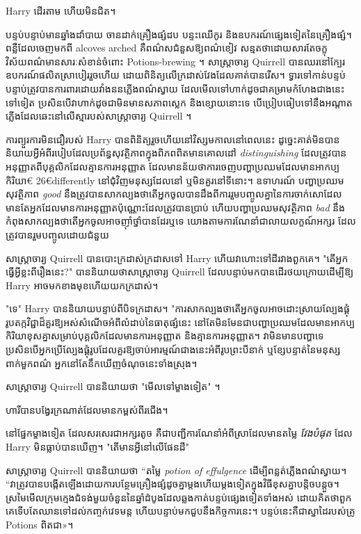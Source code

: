 Harry ដើរតាម ហើយមិនជិត។

\later

បន្ទប់បន្ទាប់​មាន​ឆ្នាំង​ដាំបាយ ចាន​ដាក់​គ្រឿង​ផ្សំ​ដប បន្ទះ​ឈើ​កូរ និង​ឧបករណ៍​ផ្សេង​ទៀត​នៃ​គ្រឿង​ផ្សំ។ ពន្លឺដែលចេញមកពី alcoves arched គឺពណ៌សជំនួសឱ្យពណ៌ខៀវ សន្មតថាដោយសារតែចក្ខុវិស័យពណ៌មានសារៈសំខាន់ចំពោះ Potions-brewing ។ សាស្ត្រាចារ្យ Quirrell បានឈរនៅក្បែរឧបករណ៍ផលិតស្រាបៀររួចហើយ ដោយពិនិត្យលើក្រដាស់វែងដែលគាត់បានរើស។ ទ្វារទៅកាន់បន្ទប់បន្ទាប់ត្រូវបានការពារដោយវាំងននភ្លើងពណ៌ស្វាយ ដែលមើលទៅហាក់ដូចជាគម្រាមកំហែងជាងនេះទៅទៀត ប្រសិនបើវាហាក់ដូចជាមិនមានសភាពស្លេក និងខ្សោយនោះទេ បើប្រៀបធៀបទៅនឹងអណ្តាតភ្លើងដែលឆេះនៅលើស្មារបស់សាស្រ្តាចារ្យ Quirrell ។

ការព្យួរការមិនជឿរបស់ Harry បានពិនិត្យរួចហើយនៅវិស្សមកាលនៅពេលនេះ ដូច្នេះគាត់មិនបាននិយាយអ្វីអំពីរបៀបដែលប្រព័ន្ធសុវត្ថិភាពក្នុងពិភពពិតមានគោលដៅ \emph{distinguishing} ដែលត្រូវបានអនុញ្ញាតពីបុគ្គលិកដែលគ្មានការអនុញ្ញាត ដែលមានន័យថាការចេញបញ្ហាប្រឈមដែលមានអាកប្បកិរិយា€ 26€{differently} នៅជុំវិញមនុស្សដែលនៅ ឬមិនគួរនៅទីនោះ។ ឧទាហរណ៍ បញ្ហាប្រឈមសុវត្ថិភាព \emph{good} នឹងត្រូវបានសាកល្បងថាតើអ្នកចូលបានដឹងពីការរួមបញ្ចូលគ្នានៃការចាក់សោដែលមានតែអ្នកដែលមានការអនុញ្ញាតប៉ុណ្ណោះដែលត្រូវបានប្រាប់ ហើយបញ្ហាប្រឈមសុវត្ថិភាព \emph{bad} នឹងកំពុងសាកល្បងថាតើអ្នកចូលអាចញ៉ាំថ្នាំបានដែរឬទេ យោងតាមការណែនាំជាលាយលក្ខណ៍អក្សរ ដែលត្រូវបានរួមបញ្ចូលដោយជំនួយ

សាស្ត្រាចារ្យ Quirrell បានបោះក្រដាស់ក្រដាសទៅ Harry ហើយវាហោះទៅដីរវាងពួកគេ។ "តើអ្នកធ្វើអ្វីខ្លះពីរឿងនេះ?" បាននិយាយថាសាស្រ្តាចារ្យ Quirrell ដែលបន្ទាប់មកបានដើរថយក្រោយដើម្បីឱ្យ Harry អាចមកខាងមុខហើយយកក្រដាស់។

"ទេ" Harry បាននិយាយបន្ទាប់ពីបិទក្រដាស។ "ការសាកល្បងថាតើអ្នកចូលអាចដោះស្រាយល្បែងផ្គុំរូបតក្កវិជ្ជាដ៏គួរឱ្យអស់សំណើចអំពីលំដាប់នៃធាតុផ្សំនេះ នៅតែមិនមែនជាបញ្ហាប្រឈមដែលមានអាកប្បកិរិយាខុសគ្នាសម្រាប់បុគ្គលិកដែលមានការអនុញ្ញាត និងគ្មានការអនុញ្ញាត។ វាមិនមានបញ្ហាទេប្រសិនបើអ្នកប្រើល្បែងផ្គុំរូបដែលគួរឱ្យចាប់អារម្មណ៍ជាងនេះអំពីរូបព្រះបីនាក់ ឬខ្សែបន្ទាត់នៃមនុស្សពាក់មួកពណ៌ អ្នកនៅតែនឹកឃើញចំណុចនេះទាំងស្រុង។

សាស្រ្តាចារ្យ Quirrell បាននិយាយថា "មើលទៅម្ខាងទៀត" ។

ហារី​បាន​បង្វែរ​ក្រណាត់​ដែល​មាន​កម្ពស់​ពីរ​ជើង។

នៅផ្នែកម្ខាងទៀត ដែលសរសេរជាអក្សរតូច គឺជាបញ្ជីការណែនាំអំពីស្រាដែលមានតម្លៃ \emph{វែងបំផុត} ដែល Harry មិនធ្លាប់បានឃើញ។ "តើមានអ្វីនៅលើផែនដី"

សាស្ត្រាចារ្យ Quirrell បាននិយាយថា “តម្លៃ \emph{ potion of effulgence} ដើម្បីពន្លត់ភ្លើងពណ៌ស្វាយ។ “វា​ត្រូវ​បាន​បង្កើត​ឡើង​ដោយ​ការ​បន្ថែម​គ្រឿង​ផ្សំ​ដូច​គ្នា​ម្តង​ហើយ​ម្តង​ទៀត​ក្នុង​វិធី​ខុស​គ្នា​បន្តិច​បន្តួច។ ស្រមៃមើលក្រុមក្មេងជំទង់មួយចំនួននៃឆ្នាំដំបូងដែលឆ្លងកាត់បន្ទប់ផ្សេងទៀតទាំងអស់ ដោយគិតថាពួកគេទើបតែឈានទៅដល់កញ្ចក់វេទមន្ត ហើយបន្ទាប់មកជួបនឹងកិច្ចការនេះ។ បន្ទប់​នេះ​គឺ​ជា​ស្នាដៃ​របស់​គ្រូ Potions ពិត​ជា»។

